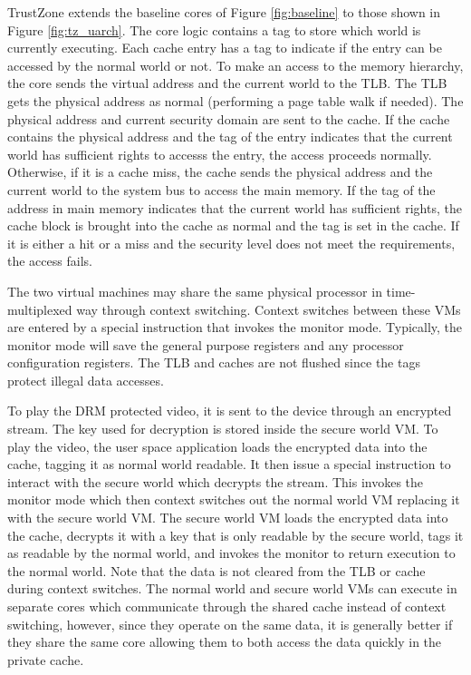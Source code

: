     TrustZone extends the baseline cores of Figure \ref{fig:baseline} to
    those shown in Figure \ref{fig:tz_uarch}. The core logic contains a tag to 
    store which world is currently executing. Each cache entry has a tag to 
    indicate if the entry can be accessed by the normal world or not. To make 
    an access to the memory hierarchy, the core sends the virtual address and 
    the current world to the TLB. The TLB gets the physical address as normal 
    (performing a page table walk if needed). The physical address and current 
    security domain are sent to the cache. If the cache contains the physical 
    address and the tag of the entry indicates that the current world has 
    sufficient rights to accesss the entry, the access proceeds normally.  
    Otherwise, if it is a cache miss, the cache sends the physical address and 
    the current world to the system bus to access the main memory. If the tag 
    of the address in main memory indicates that the current world has 
    sufficient rights, the cache block is brought into the cache as normal and 
    the tag is set in the cache. If it is either a hit or a miss and the 
    security level does not meet the requirements, the access fails.

    The two virtual machines may share the same physical processor in 
    time-multiplexed way through context switching. Context switches between 
    these VMs are entered by a special instruction that invokes the monitor 
    mode.  Typically, the monitor mode will save the general purpose registers 
    and any processor configuration registers. The TLB and caches are not 
    flushed since the tags protect illegal data accesses.

    To play the DRM protected video, it is sent to the device through an 
    encrypted stream. The key used for decryption is stored inside the secure 
    world VM. To play the video, the user space application loads the encrypted 
    data into the cache, tagging it as normal world readable. It then issue a 
    special instruction to interact with the secure world which decrypts the 
    stream. This invokes the monitor mode which then context switches out the 
    normal world VM replacing it with the secure world VM. The secure world VM 
    loads the encrypted data into the cache, decrypts it with a key that is 
    only readable by the secure world, tags it as readable by the normal world, 
    and invokes the monitor to return execution to the normal world. Note that 
    the data is not cleared from the TLB or cache during context switches.  The 
    normal world and secure world VMs can execute in separate cores which 
    communicate through the shared cache instead of context switching, however, 
    since they operate on the same data, it is generally better if they share 
    the same core allowing them to both access the data quickly in the private 
    cache.
